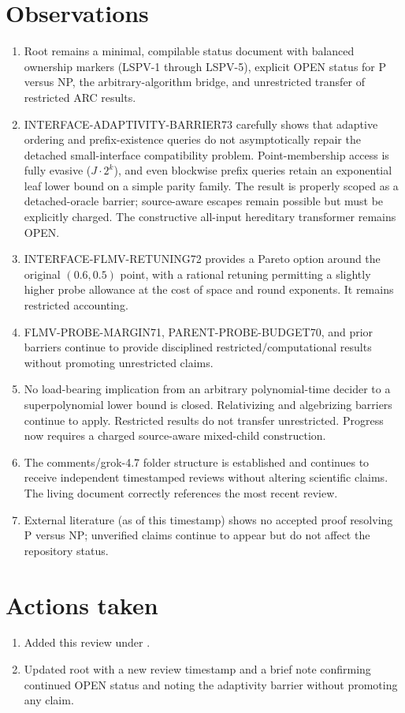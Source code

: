 \documentclass[11pt]{article}
\begin{document}
\section{Observations}
\begin{enumerate}
\item Root  remains a minimal, compilable status document with balanced ownership markers (LSPV-1 through LSPV-5), explicit OPEN status for P versus NP, the arbitrary-algorithm bridge, and unrestricted transfer of restricted ARC results.
\item INTERFACE-ADAPTIVITY-BARRIER73 carefully shows that adaptive ordering and prefix-existence queries do not asymptotically repair the detached small-interface compatibility problem. Point-membership access is fully evasive ($J\cdot 2^k$), and even blockwise prefix queries retain an exponential leaf lower bound on a simple parity family. The result is properly scoped as a detached-oracle barrier; source-aware escapes remain possible but must be explicitly charged. The constructive all-input hereditary transformer remains OPEN.
\item INTERFACE-FLMV-RETUNING72 provides a Pareto option around the original $(0.6,0.5)$ point, with a rational retuning permitting a slightly higher probe allowance at the cost of space and round exponents. It remains restricted accounting.
\item FLMV-PROBE-MARGIN71, PARENT-PROBE-BUDGET70, and prior barriers continue to provide disciplined restricted/computational results without promoting unrestricted claims.
\item No load-bearing implication from an arbitrary polynomial-time decider to a superpolynomial lower bound is closed. Relativizing and algebrizing barriers continue to apply. Restricted results do not transfer unrestricted. Progress now requires a charged source-aware mixed-child construction.
\item The comments/grok-4.7 folder structure is established and continues to receive independent timestamped reviews without altering scientific claims. The living document correctly references the most recent review.
\item External literature (as of this timestamp) shows no accepted proof resolving P versus NP; unverified claims continue to appear but do not affect the repository status.
\end{enumerate}

\section{Actions taken}
\begin{enumerate}
\item Added this review under .
\item Updated root  with a new review timestamp and a brief note confirming continued OPEN status and noting the adaptivity barrier without promoting any claim.
\end{enumerate}
\end{document}
